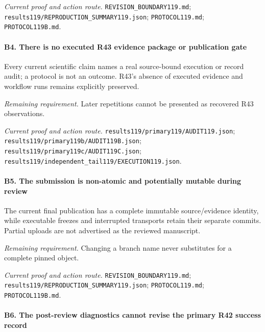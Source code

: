 \par\emph{Current proof and action route.} \nolinkurl{REVISION_BOUNDARY119.md}; \nolinkurl{results119/REPRODUCTION_SUMMARY119.json}; \nolinkurl{PROTOCOL119.md}; \nolinkurl{PROTOCOL119B.md}.

\paragraph{B4. There is no executed R43 evidence package or publication gate}

Every current scientific claim names a real source-bound execution or record audit; a protocol is not an outcome. R43's absence of executed evidence and workflow runs remains explicitly preserved.

\par\emph{Remaining requirement.} Later repetitions cannot be presented as recovered R43 observations.

\par\emph{Current proof and action route.} \nolinkurl{results119/primary119/AUDIT119.json}; \nolinkurl{results119/primary119b/AUDIT119B.json}; \nolinkurl{results119/primary119c/AUDIT119C.json}; \nolinkurl{results119/independent_tail119/EXECUTION119.json}.

\paragraph{B5. The submission is non-atomic and potentially mutable during review}

The current final publication has a complete immutable source/\allowbreak{}evidence identity, while executable freezes and interrupted transports retain their separate commits. Partial uploads are not advertised as the reviewed manuscript.

\par\emph{Remaining requirement.} Changing a branch name never substitutes for a complete pinned object.

\par\emph{Current proof and action route.} \nolinkurl{REVISION_BOUNDARY119.md}; \nolinkurl{results119/REPRODUCTION_SUMMARY119.json}; \nolinkurl{PROTOCOL119.md}; \nolinkurl{PROTOCOL119B.md}.

\paragraph{B6. The post-review diagnostics cannot revise the primary R42 success record}


